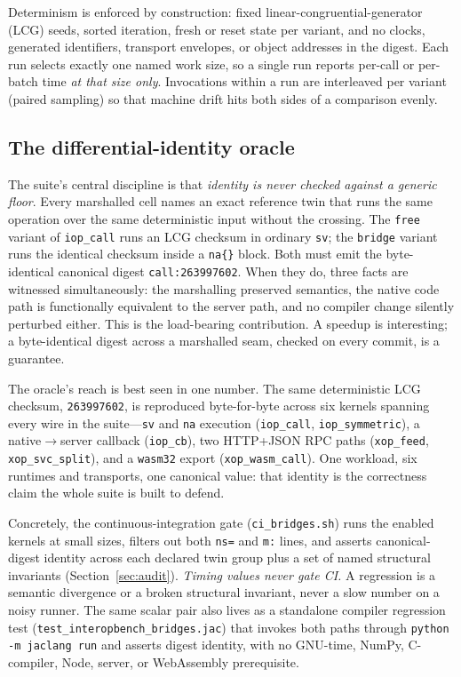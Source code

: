 \documentclass[conference]{IEEEtran}
\newcommand{\code}[1]{\texttt{#1}}
\begin{document}
Determinism is enforced by construction: fixed linear-congruential-generator
(LCG) seeds, sorted iteration, fresh or reset state per variant, and no clocks,
generated identifiers, transport envelopes, or object addresses in the digest.
Each run selects exactly one named work size, so a single run reports per-call or
per-batch time \emph{at that size only}. Invocations within a run are interleaved
per variant (paired sampling) so that machine drift hits both sides of a
comparison evenly.

\subsection{The differential-identity oracle}

The suite's central discipline is that \emph{identity is never checked against a
generic floor}. Every marshalled cell names an exact reference twin that runs the
same operation over the same deterministic input without the crossing. The
\code{free} variant of \code{iop\_call} runs an LCG checksum in ordinary
\code{sv}; the \code{bridge} variant runs the identical checksum inside a
\code{na\{\}} block. Both must emit the byte-identical canonical digest
\code{call:263997602}. When they do, three facts are witnessed simultaneously:
the marshalling preserved semantics, the native code path is functionally
equivalent to the server path, and no compiler change silently perturbed either.
This is the load-bearing contribution. A speedup is interesting; a
byte-identical digest across a marshalled seam, checked on every commit, is a
guarantee.

The oracle's reach is best seen in one number. The same deterministic LCG
checksum, \code{263997602}, is reproduced byte-for-byte across six kernels
spanning every wire in the suite---\code{sv} and \code{na} execution
(\code{iop\_call}, \code{iop\_symmetric}), a native$\rightarrow$server callback
(\code{iop\_cb}), two HTTP+JSON RPC paths (\code{xop\_feed},
\code{xop\_svc\_split}), and a \code{wasm32} export (\code{xop\_wasm\_call}).
One workload, six runtimes and transports, one canonical value: that identity is
the correctness claim the whole suite is built to defend.

Concretely, the continuous-integration gate (\code{ci\_bridges.sh}) runs the
enabled kernels at small sizes, filters out both \code{ns=} and \code{m:} lines,
and asserts canonical-digest identity across each declared twin group plus a set
of named structural invariants (Section~\ref{sec:audit}). \emph{Timing values
never gate CI.} A regression is a semantic divergence or a broken structural
invariant, never a slow number on a noisy runner. The same scalar pair also
lives as a standalone compiler regression test
(\code{test\_interopbench\_bridges.jac}) that invokes both paths through
\code{python -m jaclang run} and asserts digest identity, with no GNU-time,
NumPy, C-compiler, Node, server, or WebAssembly prerequisite.
\end{document}
